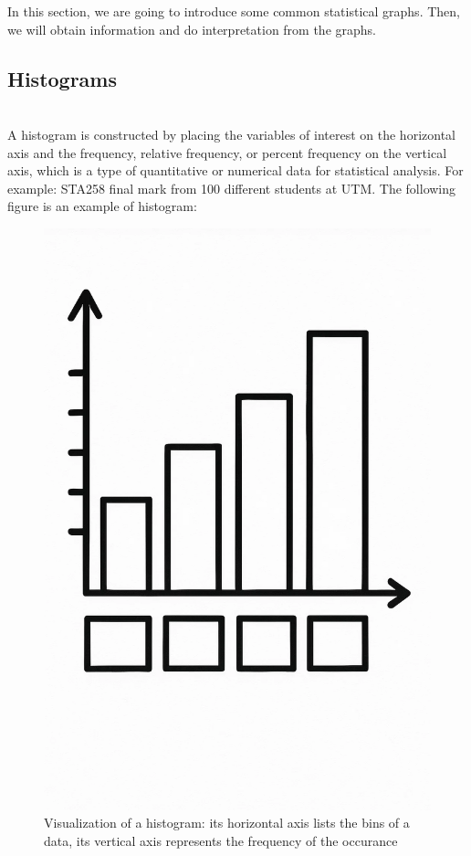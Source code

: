 \noindent
In this section, we are going to introduce some common statistical graphs. Then, we will obtain information and do interpretation from the graphs.

\subsection{Histograms}\\

\noindent
A histogram is constructed by placing the variables of interest on the horizontal axis and the frequency, relative frequency, or percent frequency on the vertical axis, which is a type of quantitative or numerical data for statistical analysis. For example: STA258 final mark from 100 different students at UTM. The following figure is an example of histogram: 

\begin{figure}[H]
 \centering
 \includegraphics[scale=0.15]{Section1/img/Histogram.jpg}
 \caption{Visualization of a histogram: its horizontal axis lists the bins of a data, its vertical axis represents the frequency of the occurance}
\end{figure}


